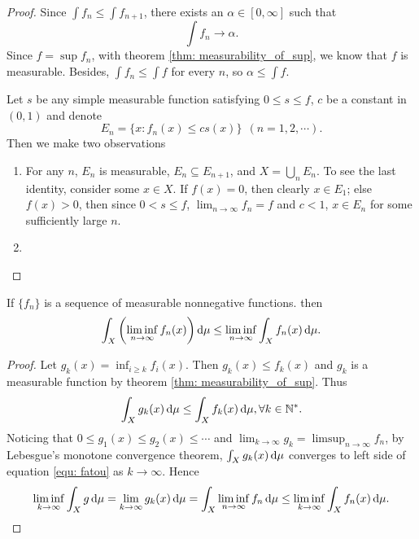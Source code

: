 \begin{proof}
Since $\int f_n \le \int f_{n+1}$, there exists an $\alpha \in [0, \infty]$ 
such that 
\begin{equation}
    \int f_n \to \alpha.
\end{equation}
Since $f = \sup f_n$, with theorem \ref{thm: measurability_of_sup}, 
we know that $f$ is measurable. Besides, $\int f_n \le \int f$ for every 
$n$, so $\alpha \le \int f$.

Let $s$ be any simple measurable function satisfying $0 \le s \le f$, 
$c$ be a constant in $(0, 1)$ and denote 
\begin{equation}
    E_n = \{x: f_n(x) \le cs(x) \} \ \ (n=1, 2, \cdots).
\end{equation}
Then we make two observations 
\begin{enumerate}
    \item For any $n$, $E_n$ is measurable, $E_n \subseteq E_{n+1}$, and 
    $X = \bigcup_n E_n$. To see the last identity, consider some $x \in X$.
    If $f(x) = 0$, then clearly $x \in E_1$; else $f(x) > 0$, then since 
    $0< s \le f$, $\lim_{n\to\infty}f_n=f$ and $c < 1$, $x \in E_n$ for 
    some sufficiently large $n$.
    \item 
\end{enumerate}
\end{proof}

\begin{thm}
If $\{f_n\}$ is a sequence of measurable nonnegative functions. then 
\begin{equation}
\label{equ: fatou}
    \int_X \left( \liminf _{n\to\infty} f_n(x)\right) \mathop{}\!\mathrm{d} \mu \le 
    \liminf_{n\to\infty} \int_X f_n(x) \mathop{}\!\mathrm{d} \mu.
\end{equation}
\end{thm}

\begin{proof}
Let $g_k(x) = \inf_{i \ge k} f_i(x)$. Then $g_k(x) \le f_k(x)$ and $g_k$ is 
a measurable function by theorem \ref{thm: measurability_of_sup}. Thus 
\begin{equation}
    \int_X g_k(x) \mathop{}\!\mathrm{d} \mu \le \int_X f_k(x) \mathop{}\!\mathrm{d} \mu, \forall k \in 
    \mathbb{N}^\ast.
\end{equation}
Noticing that $0 \le g_1(x) \le g_2(x) \le \cdots$ and $\lim_{k\to \infty}
g_k = \limsup_{n\to\infty}f_n$, by Lebesgue's monotone convergence theorem, 
$\int_X g_k(x) \mathop{}\!\mathrm{d} \mu$ converges to left side of equation 
\ref{equ: fatou} as $k\to\infty$. Hence 
\begin{equation}
    \liminf_{k\to \infty} \int_X g \mathop{}\!\mathrm{d}\mu 
    = \lim_{k\to\infty}g_k(x)\mathop{}\!\mathrm{d}\mu 
    = \int_X \liminf_{n\to\infty} f_n \mathop{}\!\mathrm{d} \mu 
    \le \liminf _{k\to\infty} \int_X f_n(x) \mathop{}\!\mathrm{d} \mu.
\end{equation} 
\end{proof}